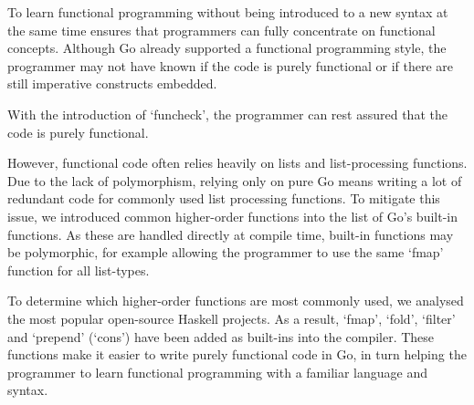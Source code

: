 
To learn functional programming without being introduced to a new syntax at the same time
ensures that programmers can fully concentrate on functional concepts. Although Go already
supported a functional programming style, the programmer may not have known if the code is
purely functional or if there are still imperative constructs embedded.

With the introduction of `funcheck', the programmer can rest assured that the code is purely
functional.

However, functional code often relies heavily on lists and list-processing functions.
Due to the lack of polymorphism, relying only on pure Go means writing a lot of redundant code
for commonly used list processing functions. To mitigate this issue, we introduced
common higher-order functions into the list of Go's built-in functions.
As these are handled directly at compile time, built-in functions may be polymorphic, for
example allowing the programmer to use the same `fmap' function for all list-types.

To determine which higher-order functions are most commonly used, we analysed the most
popular open-source Haskell projects. As a result, `fmap', `fold', `filter' and `prepend'
(`cons') have been added as built-ins into the compiler.
These functions make it easier to write purely functional code in Go, in turn helping
the programmer to learn functional programming with a familiar language and syntax.
